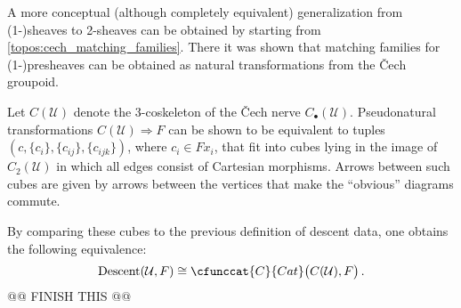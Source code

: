 
    A more conceptual (although completely equivalent) generalization from (1-)sheaves to 2-sheaves can be obtained by starting from \cref{topos:cech_matching_families}. There it was shown that matching families for (1-)presheaves can be obtained as natural transformations from the \v{C}ech groupoid.
    \begin{property}
        Let $C(\mathcal{U})$ denote the 3-coskeleton of the \v{C}ech nerve $C_\bullet(\mathcal{U})$. Pseudonatural transformations $C(\mathcal{U})\Rightarrow F$ can be shown to be equivalent to tuples $(c,\{c_i\},\{c_{ij}\},\{c_{ijk}\})$, where $c_i\in Fx_i$, that fit into cubes lying in the image of $C_2(\mathcal{U})$ in which all edges consist of Cartesian morphisms. Arrows between such cubes are given by arrows between the vertices that make the ``obvious'' diagrams commute.

        By comparing these cubes to the previous definition of descent data, one obtains the following equivalence:
        \begin{gather}
            \mathrm{Descent}(\mathcal{U},F)\cong\cfunccat{C}{Cat}\bigl(C(\mathcal{U}),F\bigr)\,.
        \end{gather}
        @@ FINISH THIS @@
    \end{property}

